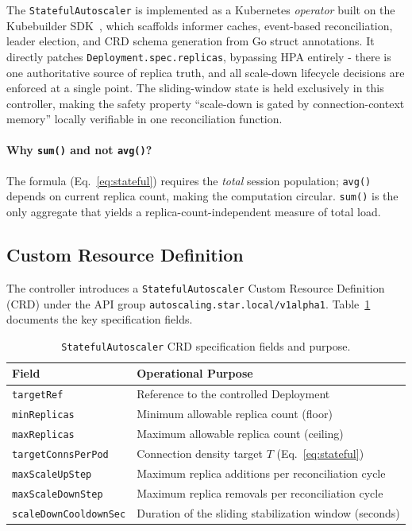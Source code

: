 \documentclass[3p,twocolumn]{elsarticle}
\theoremstyle{plain}%
\theoremstyle{definition}%
\begin{document}
The \texttt{StatefulAutoscaler} is implemented as a Kubernetes \textit{operator} built on the Kubebuilder SDK~\cite{kubebuilder_docs}, which scaffolds informer caches, event-based reconciliation, leader election, and CRD schema generation from Go struct annotations. It directly patches \texttt{Deployment.spec.replicas}, bypassing HPA entirely - there is one authoritative source of replica truth, and all scale-down lifecycle decisions are enforced at a single point. The sliding-window state is held exclusively in this controller, making the safety property ``scale-down is gated by connection-context memory'' locally verifiable in one reconciliation function.

\paragraph{Why \texttt{sum()} and not \texttt{avg()}?}
The formula (Eq.~\ref{eq:stateful}) requires the \textit{total} session population; \texttt{avg()} depends on current replica count, making the computation circular. \texttt{sum()} is the only aggregate that yields a replica-count-independent measure of total load.

\subsection{Custom Resource Definition}

The controller introduces a \texttt{StatefulAutoscaler} Custom Resource Definition (CRD)
under the API group \texttt{autoscaling.star.local/v1alpha1}. Table~\ref{tab:crd} documents the
key specification fields.

\begin{table}[!tp]
\centering
\caption{\texttt{StatefulAutoscaler} CRD specification fields and purpose.}
\label{tab:crd}
\small
\begin{tabular}{l p{9.5cm}}
\toprule
\rowcolor{gray!12}
\textbf{Field} & \textbf{Operational Purpose} \\
\midrule
\texttt{targetRef} & Reference to the controlled Deployment \\
\texttt{minReplicas} & Minimum allowable replica count (floor) \\
\texttt{maxReplicas} & Maximum allowable replica count (ceiling) \\
\texttt{targetConnsPerPod} & Connection density target $T$ (Eq.~\ref{eq:stateful}) \\
\texttt{maxScaleUpStep} & Maximum replica additions per reconciliation cycle \\
\texttt{maxScaleDownStep} & Maximum replica removals per reconciliation cycle \\
\texttt{scaleDownCooldownSec} & Duration of the sliding stabilization window (seconds) \\
\bottomrule
\end{tabular}
\end{table}
\end{document}
